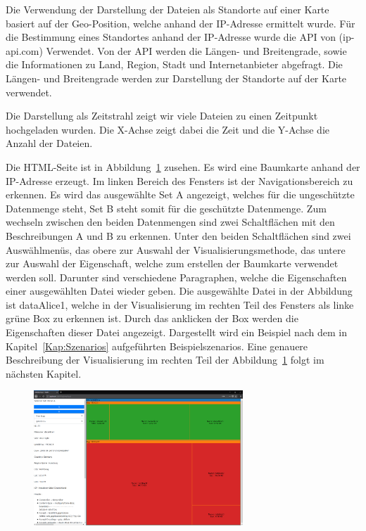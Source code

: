 \documentclass[
    fontsize=12pt,
    headings=small,
    parskip=half,           %
    bibliography=totoc,
    numbers=noenddot,       %
    open=any,               %
    ]{scrreprt}
\begin{document}
Die Verwendung der Darstellung der Dateien als Standorte auf einer Karte basiert auf der Geo-Position, welche anhand der IP-Adresse ermittelt wurde.
Für die Bestimmung eines Standortes anhand der IP-Adresse wurde die \ac{API} von (ip-api.com) Verwendet. 
Von der \ac{API} werden die Längen- und Breitengrade, sowie die Informationen zu Land, Region, Stadt und Internetanbieter abgefragt.
Die Längen- und Breitengrade werden zur Darstellung der Standorte auf der Karte verwendet.

Die Darstellung als Zeitstrahl zeigt wir viele Dateien zu einen Zeitpunkt hochgeladen wurden.
Die X-Achse zeigt dabei die Zeit und die Y-Achse die Anzahl der Dateien.
 
Die HTML-Seite ist in Abbildung~\ref{fig:VisualPageAll} zusehen. 
Es wird eine Baumkarte anhand der IP-Adresse erzeugt. 
Im linken Bereich des Fensters ist der Navigationsbereich zu erkennen. 
Es wird das ausgewählte Set A angezeigt, welches für die ungeschützte Datenmenge steht, Set B steht somit für die geschützte Datenmenge.
Zum wechseln zwischen den beiden Datenmengen sind zwei Schaltflächen mit den Beschreibungen A und B zu erkennen.
Unter den beiden Schaltflächen sind zwei Auswählmenüs, das obere zur Auswahl der Visualisierungsmethode, das untere zur Auswahl der Eigenschaft, welche zum erstellen der Baumkarte verwendet werden soll.
Darunter sind verschiedene Paragraphen, welche die Eigenschaften einer ausgewählten Datei wieder geben.
Die ausgewählte Datei in der Abbildung ist dataAlice1, welche in der Visualisierung im rechten Teil des Fensters als linke grüne Box zu erkennen ist.
Durch das anklicken der Box werden die Eigenschaften dieser Datei angezeigt. 
Dargestellt wird ein Beispiel nach dem in Kapitel~\ref{Kap:Szenarios} aufgeführten Beispielszenarios.
Eine genauere Beschreibung der Visualisierung im rechten Teil der Abbildung~\ref{fig:VisualPageAll} folgt im nächsten Kapitel. 

\begin{figure}[H]
\includegraphics[width=0.7\textwidth]{../pic/VisualPageAll.png}
\label{fig:VisualPageAll}
\end{figure}
\end{document}
